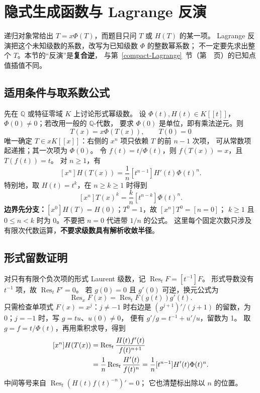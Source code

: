 \section{隐式生成函数与 Lagrange 反演}\label{knowledge-lagrange-inversion}
递归对象常给出 $T=x\Phi(T)$，而题目只问 $T$ 或 $H(T)$ 的某一项。
Lagrange 反演把这个未知级数的系数，改写为已知级数 $\Phi$ 的整数幂系数；
不一定要先求出整个 $T$。本节的“反演”是\textbf{复合逆}，
与第~\ref{compact-Lagrange}~节（第~\pageref{compact-Lagrange}~页）的已知点值插值不同。

\subsection{适用条件与取系数公式}
先在 $\mathbb Q$ 或特征零域 $K$ 上讨论形式幂级数。
设 $\Phi(t),H(t)\in K[[t]]$，$\Phi(0)\ne0$；若改用一般的 $\mathbb Q$-代数，
要求 $\Phi(0)$ 是单位，即有乘法逆元。则
\[
T(x)=x\Phi(T(x)),\qquad T(0)=0
\]
唯一确定 $T\in xK[[x]]$：右侧的 $x^n$ 项只依赖 $T$ 的前 $n-1$ 次项，
可从常数项起递推；其一次项为 $\Phi(0)$。
令 $f(t)=t/\Phi(t)$，则 $f(T(x))=x$，且 $T(f(t))=t$。
对 $n\ge1$，有
\[
\boxed{[x^n]H(T(x))=\frac1n[t^{n-1}]H'(t)\Phi(t)^n.}
\]
特别地，取 $H(t)=t^k$，在 $n\ge k\ge1$ 时得到
\[
\boxed{[x^n]T(x)^k=\frac{k}{n}[t^{n-k}]\Phi(t)^n.}
\]
\textbf{边界先分支：}$[x^0]H(T)=H(0)$；$T^0=1$，故 $[x^n]T^0=[n=0]$；
$k\ge1$ 且 $0\le n<k$ 时为 0。不要把 $n=0$ 代进带 $1/n$ 的公式。
这里每个固定次数只涉及有限次代数运算，\textbf{不要求级数具有解析收敛半径}。

\subsection{形式留数证明}
对只有有限个负次项的形式 Laurent 级数，记
$\operatorname{Res}_t F=[t^{-1}]F$。
形式导数没有 $t^{-1}$ 项，故 $\operatorname{Res}_t F'=0$。
若 $g(0)=0$ 且 $g'(0)$ 可逆，换元公式为
\[
\operatorname{Res}_x F(x)=\operatorname{Res}_t F(g(t))g'(t).
\]
只需检查单项式 $F(x)=x^j$：$j\ne-1$ 时右边是
$(g^{j+1})'/(j+1)$ 的留数，为 0；$j=-1$ 时，写 $g=tu$、$u(0)\ne0$，
便有 $g'/g=t^{-1}+u'/u$，留数为 1。
取 $g=f=t/\Phi(t)$，再用乘积求导，得到
\[
\begin{aligned}
\relax [x^n]H(T(x))
 &=\operatorname{Res}_t\frac{H(t)f'(t)}{f(t)^{n+1}}\\
 &=\frac1n\operatorname{Res}_t\frac{H'(t)}{f(t)^n}
 =\frac1n[t^{n-1}]H'(t)\Phi(t)^n.
\end{aligned}
\]
中间等号来自 $\operatorname{Res}_t(H(t)f(t)^{-n})'=0$；
它也清楚标出除以 $n$ 的位置。

